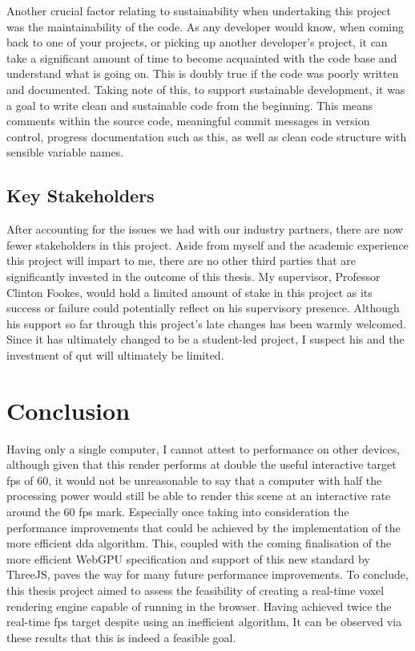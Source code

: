 \documentclass[titlepage]{article}
\begin{document}
Another crucial factor relating to sustainability when undertaking this project was the maintainability of the code. As any developer would know, when coming back to one of your projects, or picking up another developer's project, it can take a significant amount of time to become acquainted with the code base and understand what is going on. This is doubly true if the code was poorly written and documented. Taking note of this, to support sustainable development, it was a goal to write clean and sustainable code from the beginning. This means comments within the source code, meaningful commit messages in version control, progress documentation such as this, as well as clean code structure with sensible variable names.

\subsection{Key Stakeholders}
After accounting for the issues we had with our industry partners, there are now fewer stakeholders in this project. Aside from myself and the academic experience this project will impart to me, there are no other third parties that are significantly invested in the outcome of this thesis. My supervisor, Professor Clinton Fookes, would hold a limited amount of stake in this project as its success or failure could potentially reflect on his supervisory presence. Although his support so far through this project's late changes has been warmly welcomed. Since it has ultimately changed to be a student-led project, I suspect his and the investment of \gls{qut} will ultimately be limited.

\section{Conclusion}

Having only a single computer, I cannot attest to performance on other devices, although given that this render performs at double the useful interactive target \gls{fps} of 60, it would not be unreasonable to say that a computer with half the processing power would still be able to render this scene at an interactive rate around the 60 \gls{fps} mark. Especially once taking into consideration the performance improvements that could be achieved by the implementation of the more efficient \gls{dda} algorithm. This, coupled with the coming finalisation of the more efficient WebGPU specification and support of this new standard by ThreeJS, paves the way for many future performance improvements. To conclude, this thesis project aimed to assess the feasibility of creating a real-time voxel rendering engine capable of running in the browser. Having achieved twice the real-time \gls{fps} target despite using an inefficient algorithm, It can be observed via these results that this is indeed a feasible goal.
\end{document}
